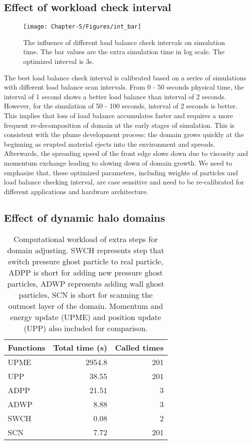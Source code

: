\subsection{Effect of workload check interval} \label{sec:effect-of-workload-check-interval}
\begin{figure}
\centering
{\texttt{[image: Chapter-5/Figures/int\_bar]}}
{\caption{The influence of different load balance check intervals on simulation time. The bar values are the extra simulation time in log scale. The optimized interval is 3s.}
\label{fig:check_int}}
\end{figure}
The best load balance check interval is calibrated based on a series of simulations with different load balance scan intervals. From 0 - 50 seconds physical time, the interval of 1 second shows a better load balance than interval of 2 seconds. However, for the simulation of 50 - 100 seconds, interval of 2 seconds is better. This implies that loss of load balance accumulates faster and requires a more frequent re-decomposition of domain at the early stages of simulation. This is consistent with the plume development process: the domain grows quickly at the beginning as erupted material ejects into the environment and spreads. Afterwards, the spreading speed of the front edge slows down due to viscosity and momentum exchange leading to slowing down of domain growth. We need to emphasize that, these optimized parameters, including weights of particles and load balance checking interval, are case sensitive and need to be re-calibrated for different applications and hardware architecture.

\subsection{Effect of dynamic halo domains} \label{sec:effect-of-halo-domain}

\begin{table}
\centering
{\caption{Computational workload of extra steps for domain adjusting. SWCH represents step that switch pressure ghost particle to real particle, ADPP is short for adding new pressure ghost particles, ADWP represents adding wall ghost particles, SCN is short for scanning the outmost layer of the domain.  Momentum and energy update (UPME) and position update (UPP) also included for comparison.}  
    \begin{tabular}{lrr}
    \hline
    Functions & Total time (s) & Called times\\
    	\hline
    UPME & 2954.8 & 201 \\
    UPP & 38.55 &  201 \\
    ADPP & 21.51 & 3 \\
    ADWP  & 8.88 & 3 \\
    SWCH & 0.08 &  2 \\
    SCN  & 7.72 & 201 \\
    \hline
   \end{tabular}
\label{tab:Computational_cost_doamin_adj}}
\end{table}

